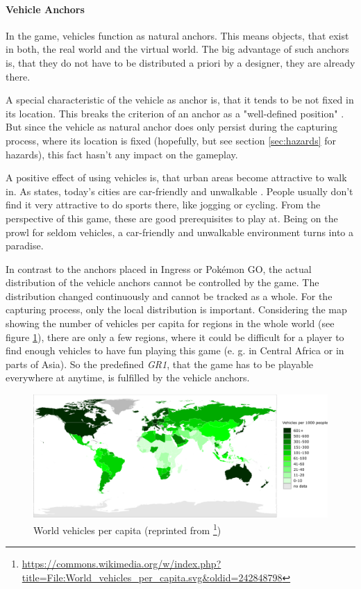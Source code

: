 \paragraph{Vehicle Anchors}
In the game, vehicles function as natural anchors. This means objects, that exist in both, the real world and the virtual world. The big advantage of such anchors is, that they do not have to be distributed a priori by a designer, they are already there.

A special characteristic of the vehicle as anchor is, that it tends to be not fixed in its location. This breaks the criterion of an anchor as a "well-defined position" \citep{hock2014augmented}. But since the vehicle as natural anchor does only persist during the capturing process, where its location is fixed (hopefully, but see section \ref{sec:hazards} for hazards), this fact hasn't any impact on the gameplay.

A positive effect of using vehicles is, that urban areas become attractive to walk in. As \citeauthor{gehl2013cities} states, today's cities are car-friendly and unwalkable \citep{gehl2013cities}. People usually don't find it very attractive to do sports there, like jogging or cycling. From the perspective of this game, these are good prerequisites to play at. Being on the prowl for seldom vehicles, a car-friendly and unwalkable environment turns into a paradise.

In contrast to the anchors placed in Ingress or Pok\'{e}mon GO, the actual distribution of the vehicle anchors cannot be controlled by the game. The distribution changed continuously and cannot be tracked as a whole. For the capturing process, only the local distribution is important. Considering the map showing the number of vehicles per capita for regions in the whole world (see figure \ref{fig:worldVehicles}), there are only a few regions, where it could be difficult for a player to find enough vehicles to have fun playing this game (e. g. in Central Africa or in parts of Asia). So the predefined \emph{GR1}, that the game has to be playable everywhere at anytime, is fulfilled by the vehicle anchors.

\begin{figure}[btph]
  \centering
        \includegraphics[width=.95\linewidth]{gfx/world_vehicles_per_capita}
        \caption{World vehicles per capita (reprinted from \footnote{\url{https://commons.wikimedia.org/w/index.php?title=File:World_vehicles_per_capita.svg&oldid=242848798}})}
        \label{fig:worldVehicles}
\end{figure}

